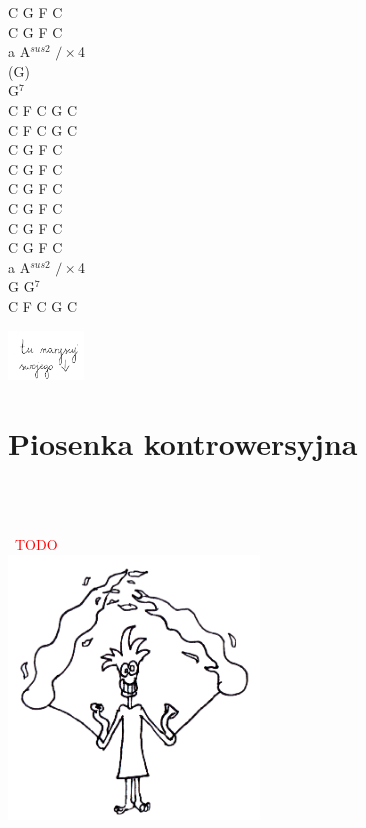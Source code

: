 \documentclass[a5paper, 10pt]{book}
\begin{document}
\begin{minipage}[t]{0.2\textwidth}
C G F C\\
C G F C\\

a A$^{sus2}$ $/ \times$4\\
(G)\\
G$^7$\\

C F C G C\\
C F C G C\\

C G F C\\
C G F C\\

C G F C\\
C G F C\\

C G F C\\
C G F C\\

a A$^{sus2}$ $/ \times$4\\
G G$^7$\\

C F C G C\\
\end{minipage}
\includegraphics[width=0.15\textwidth, center]{images/pila.png}\\

\newpage
\section{Piosenka kontrowersyjna}\textcolor{lightgray}{\textit{}}\\~\\
\begin{minipage}[t]{0.8\textwidth}\
  \textcolor{red}{TODO}\\
  \includegraphics[width=0.5\textwidth,center]{images/piosenka_kontrowersyjna.png}\\
\end{minipage}
\begin{minipage}[t]{0.8\textwidth}
\end{minipage}
\end{document}
